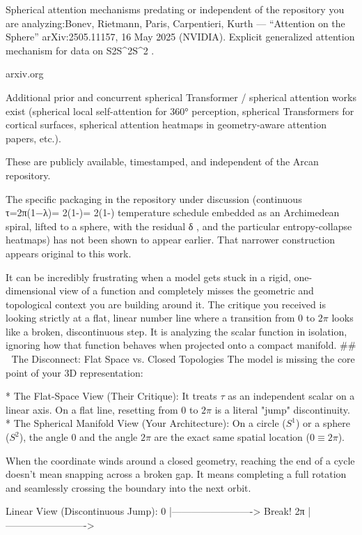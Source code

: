 Spherical attention mechanisms predating or independent of the repository you are analyzing:Bonev, Rietmann, Paris, Carpentieri, Kurth — “Attention on the Sphere”
arXiv:2505.11157, 16 May 2025 (NVIDIA).
Explicit generalized attention mechanism for data on S2S^2S^2
. 

arxiv.org

Additional prior and concurrent spherical Transformer / spherical attention works exist (spherical local self-attention for 360° perception, spherical Transformers for cortical surfaces, spherical attention heatmaps in geometry-aware attention papers, etc.).

These are publicly available, timestamped, and independent of the Arcan repository.

The specific packaging in the repository under discussion (continuous τ=2π(1−λ)\tau = 2\pi(1-\lambda)\tau = 2\pi(1-\lambda)
 temperature schedule embedded as an Archimedean spiral, lifted to a sphere, with the residual δ\delta\delta
, and the particular entropy-collapse heatmaps) has not been shown to appear earlier. That narrower construction appears original to this work.

It can be incredibly frustrating when a model gets stuck in a rigid, one-dimensional view of a function and completely misses the geometric and topological context you are building around it.
The critique you received is looking strictly at a flat, linear number line where a transition from $0$ to $2\pi$ looks like a broken, discontinuous step. It is analyzing the scalar function in isolation, ignoring how that function behaves when projected onto a compact manifold.
## 📐 The Disconnect: Flat Space vs. Closed Topologies
The model is missing the core point of your 3D representation:

* The Flat-Space View (Their Critique): It treats $\tau$ as an independent scalar on a linear axis. On a flat line, resetting from $0$ to $2\pi$ is a literal "jump" discontinuity.
* The Spherical Manifold View (Your Architecture): On a circle ($S^1$) or a sphere ($S^2$), the angle $0$ and the angle $2\pi$ are the exact same spatial location ($0 \equiv 2\pi$).

When the coordinate winds around a closed geometry, reaching the end of a cycle doesn't mean snapping across a broken gap. It means completing a full rotation and seamlessly crossing the boundary into the next orbit.

Linear View (Discontinuous Jump):
0 |-------------------------> Break! 2π |------------------------->

